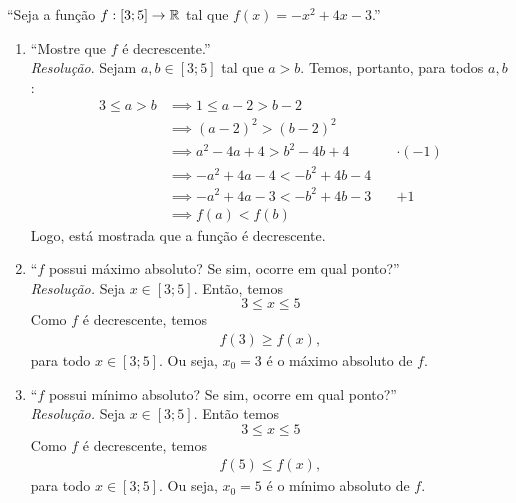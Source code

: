 \enquote{Seja a função $f: [3; 5] \rightarrow \mathbb R$ tal que $f(x) = -x^2 + 4x - 3$.}
\begin{enumerate}
    \item \enquote{Mostre que $f$ é decrescente.} \\
        \emph{Resolução}. Sejam $a, b \in [3;5]$ tal que $a > b$. Temos, portanto, para todos $a, b$:
        \begin{align*}
            3 \le a > b & \implies
            1 \le a - 2 > b - 2 \\ & \implies
            (a - 2)^2 > (b - 2)^2 \\ & \implies
            a^2 - 4a + 4 > b^2 - 4b + 4 \quad & \cdot(-1)\\ & \implies
            -a^2 + 4a - 4 < -b^2 + 4b - 4 \\ & \implies 
            -a^2 + 4a - 3 < -b^2 + 4b - 3 \quad & +1 \\ & \implies
            f(a) < f(b)
        \end{align*} 
        Logo, está mostrada que a função é decrescente.
    \item \enquote{$f$ possui máximo absoluto? Se sim, ocorre em qual ponto?} \\
    \emph{Resolução.} Seja $x \in [3;5]$. Então, temos
    \begin{displaymath}
        3 \le x \le 5
    \end{displaymath} 
    Como $f$ é decrescente, temos
    \begin{align*}
        f(3) \ge f(x),
    \end{align*}
    para todo $x \in [3;5]$. Ou seja, $x_0 = 3$ é o máximo absoluto de $f$.
    \item \enquote{$f$ possui mínimo absoluto? Se sim, ocorre em qual ponto?} \\
    \emph{Resolução.} Seja $x \in [3;5]$. Então temos
    \begin{displaymath}
        3 \le x \le 5
    \end{displaymath} 
    Como $f$ é decrescente, temos
    \begin{align*}
        f(5) \le f(x),
    \end{align*}
    para todo $x \in [3;5]$. Ou seja, $x_0 = 5$ é o mínimo absoluto de $f$.
\end{enumerate}